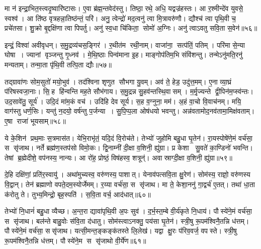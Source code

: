 मा न॑ इन्द्रा॒भित॒स्त्वदृ॒ष्वारि॑ष्टासः।
ए॒वा ब्र॑ह्म॒न्तवेद॑स्तु।
तिष्ठा॒ रथे॒ अधि॒ यद्वज्र॑हस्तः।
आ र॒श्मीन्दे॑व युवसे॒ स्वश्व॑।
आ ति॑ष्ठ वृत्रहन्ना॒तिष्ठ॑न्तं॒ परि॑।
अनु॒ त्वेन्द्रो॑ मद॒त्वनु॑ त्वा मि॒त्रावरु॑णौ।
द्यौश्च॑ त्वा पृथि॒वी च॒ प्रचे॑तसा।
शु॒क्रो बृ॒द्दक्षि॑णा त्वा पिपर्तु।
अनु॑ स्व॒धा चि॑किता॒ सोमो॑ अ॒ग्निः।
अनु॑ त्वाऽवतु सवि॒ता स॒वेन॑॥५६॥

इन्द्रं॒ विश्वा॑ अवीवृधन्।
स॒मु॒द्रव्य॑चस॒ङ्गिर॑।
र॒थीत॑म रथी॒नाम्।
वाजा॑ना॒ सत्प॑तिं॒ पतिम्।
परि॑मा से॒न्या घोषा।
ज्यानां वृञ्जन्तु गृ॒ध्नव॑।
मे॒थि॒ष्ठाः पिन्व॑माना इ॒ह।
माङ्गोप॑तिम॒भि संवि॑शन्तु।
तन्मेऽनु॑मति॒रनु॑ मन्यताम्।
तन्मा॒ता पृ॑थि॒वी तत्पि॒ता द्यौः॥५७॥

तद्ग्रावा॑णः सोम॒सुतो॑ मयो॒भुव॑।
तद॑श्विना शृणुत सौभगा यु॒वम्।
अव॑ ते॒ हेड॒ उदु॑त्त॒मम्।
ए॒ना व्या॒घ्रं प॑रिषस्वजा॒नाः।
सि॒ह हि॑न्वन्ति मह॒ते सौभ॑गाय।
स॒मु॒द्रन्न सु॒हव॑न्तस्थि॒वासम्।
म॒र्मृ॒ज्यन्ते द्वी॒पिन॑म॒प्स्व॑न्तः।
उद॒सावे॑तु॒ सूर्य॑।
उदि॒दं मा॑म॒कं वच॑।
उदि॑हि देव सूर्य।
स॒ह व॒ग्नुना॒ मम॑।
अ॒हं वा॒चो वि॒वाच॑नम्।
मयि॒ वाग॑स्तु धर्ण॒सिः।
यन्तु॑ न॒दयो॒ वर्\mbox{}ष॑न्तु प॒र्जन्या।
सु॒पि॒प्प॒ला ओष॑धयो भवन्तु।
अन्न॑वतामोद॒नव॑तामा॒मिक्ष॑वताम्।
ए॒षा राजा॑ भूयसाम्॥५८॥\anuvakamend[स्व॒धायै त्वा स॒वेन॒ द्यौः सूर्य स॒प्त च॑]

ये के॒शिन॑ प्रथ॒माः स॒त्रमास॑त।
येभि॒राभृ॑तं॒ यदि॒दं वि॒रोच॑ते।
तेभ्यो॑ जुहोमि बहु॒धा घृ॒तेन॑।
रा॒यस्पोषे॑णे॒मं वर्च॑सा॒ स सृ॑जाथ।
नर्ते ब्रह्म॑ण॒स्तप॑सो विमो॒कः।
द्वि॒नाम्नी॑ दी॒क्षा व॒शिनी॒ ह्यु॑ग्रा।
प्र केशा सु॒वते॑ का॒ण्डिनो॑ भवन्ति।
तेषां ब्र॒ह्मेदीशे॒ वप॑नस्य॒ नान्यः।
आ रो॑ह॒ प्रोष्ठं॒ विष॑हस्व॒ शत्रून्॑।
अवास्राग्दी॒क्षा व॒शिनी॒ ह्यु॑ग्रा॥५९॥

दे॒हि दक्षि॑णां॒ प्रति॑र॒स्वायु॑।
अथा॑मुच्यस्व॒ वरु॑णस्य॒ पाशात्।
येनाव॑पत्सवि॒ता क्षु॒रेण॑।
सोम॑स्य॒ राज्ञो॒ वरु॑णस्य वि॒द्वान्।
तेन॑ ब्रह्माणो वपते॒दम॒स्योर्जेमम्।
र॒य्या वर्च॑सा॒ स सृ॑जाथ।
मा ते॒ केशा॒ननु॑ गा॒द्वर्च॑ ए॒तत्।
तथा॑ धा॒ता क॑रोतु ते।
तुभ्य॒मिन्द्रो॒ बृह॒स्पति॑।
स॒वि॒ता वर्च॒ आद॑धात्॥६०॥

तेभ्यो॑ नि॒धानं॑ बहु॒धा व्यैच्छ\sn{}।
अ॒न्त॒रा द्यावा॑पृथि॒वी अ॒पः सुव॑।
द॒र्भ॒स्त॒म्बे वी॒र्य॑कृते नि॒धाय॑।
पौस्ये॑ने॒मं वर्च॑सा॒ स सृ॑जाथ।
बल॑न्ते बाहु॒वोः स॑वि॒ता द॑धातु।
सोम॑स्त्वाऽनक्तु॒ पय॑सा घृ॒तेन॑।
स्त्री॒षु रू॒पम॑श्विनै॒तन्नि ध॑त्तम्।
पौस्ये॑ने॒मं वर्च॑सा॒ ससृ॑जाथ।
यत्सी॒मन्त॒ङ्कङ्क॑तस्ते लि॒लेख॑।
यद्वा क्षु॒रः प॑रिव॒वर्ज॒ वपस्ते।
स्त्री॒षु रू॒पम॑श्विनै॒तन्नि ध॑त्तम्।
पौस्ये॑ने॒म स सृ॑जाथो वी॒र्ये॑ण॥६१॥\anuvakamend[अवास्राग्दी॒क्षा व॒शिनी॒ ह्यु॑ग्राऽद॑धाद्व॒वर्ज॒ वप स्ते॒ द्वे च॑]

